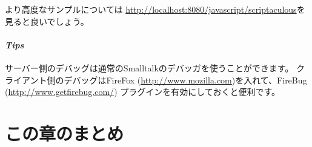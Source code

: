 \documentclass[a4paper,10pt,twoside]{book}
\begin{document}
より高度なサンプルについては \url{http://localhost:8080/javascript/scriptaculous}を見ると良いでしょう。

\paragraph{\emph{Tips}}
サーバー側のデバッグは通常のSmalltalkのデバッガを使うことができます。
クライアント側のデバッグはFireFox (\url{http://www.mozilla.com})を入れて、FireBug (\url{http://www.getfirebug.com/}) プラグインを有効にしておくと便利です。

\section{この章のまとめ}

\end{document}
